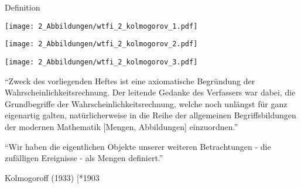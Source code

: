 \documentclass[
  8pt,
  ignorenonframetext,
]{beamer}
\begin{document}
\begin{frame}{Definition}
\protect\hypertarget{definition-2}{}
\begin{minipage}{.29\linewidth}
\begin{center}
\texttt{[image: 2\_Abbildungen/wtfi\_2\_kolmogorov\_1.pdf]}
\end{center}
\end{minipage}
\begin{minipage}{.29\linewidth}
\begin{center}
\texttt{[image: 2\_Abbildungen/wtfi\_2\_kolmogorov\_2.pdf]}
\end{center}
\end{minipage}
\begin{minipage}{.29\linewidth}
\begin{center}
\texttt{[image: 2\_Abbildungen/wtfi\_2\_kolmogorov\_3.pdf]}
\end{center}
\end{minipage}

\footnotesize
{}

``Zweck des vorliegenden Heftes ist eine axiomatische Begründung der
Wahrscheinlichkeitsrechnung. Der leitende Gedanke des Verfassers war
dabei, die Grundbegriffe der Wahrscheinlichkeitsrechnung, welche noch
unlängst für ganz eigenartig galten, natürlicherweise in die Reihe der
allgemeinen Begriffsbildungen der modernen Mathematik {[}Mengen,
Abbildungen{]} einzuordnen.''

``Wir haben die eigentlichen Objekte unserer weiteren Betrachtungen -
die zufälligen Ereignisse - als Mengen definiert.''

\flushright

Kolmogoroff (1933) {[}*1903 \textdagger 1987{]}
\end{frame}
\end{document}
